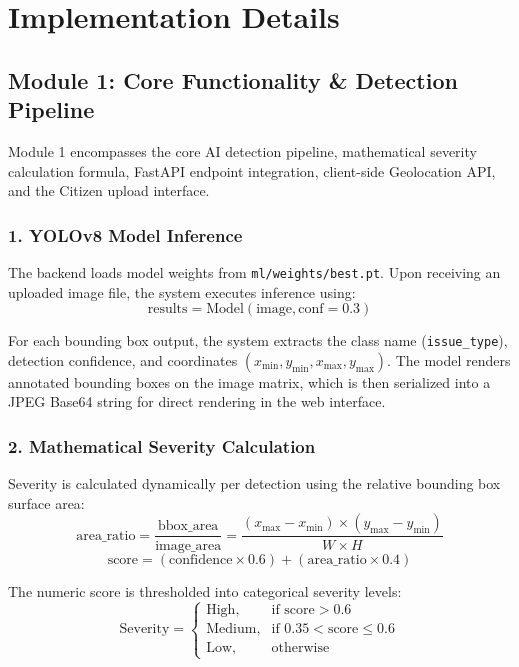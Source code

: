 \documentclass{tietreport}
\begin{document}
\section{Implementation Details}

\subsection{Module 1: Core Functionality \& Detection Pipeline}

Module 1 encompasses the core AI detection pipeline, mathematical severity calculation formula, FastAPI endpoint integration, client-side Geolocation API, and the Citizen upload interface.

\subsubsection{1. YOLOv8 Model Inference}
The backend loads model weights from \texttt{ml/weights/best.pt}. Upon receiving an uploaded image file, the system executes inference using:
\begin{equation}
  \text{results} = \text{Model}(\text{image}, \text{conf} = 0.3)
\end{equation}

For each bounding box output, the system extracts the class name (\texttt{issue\_type}), detection confidence, and coordinates $(x_{\min}, y_{\min}, x_{\max}, y_{\max})$. The model renders annotated bounding boxes on the image matrix, which is then serialized into a JPEG Base64 string for direct rendering in the web interface.

\subsubsection{2. Mathematical Severity Calculation}
Severity is calculated dynamically per detection using the relative bounding box surface area:
\begin{equation}
  \text{area\_ratio} = \frac{\text{bbox\_area}}{\text{image\_area}} = \frac{(x_{\max} - x_{\min}) \times (y_{\max} - y_{\min})}{W \times H}
\end{equation}
\begin{equation}
  \text{score} = (\text{confidence} \times 0.6) + (\text{area\_ratio} \times 0.4)
\end{equation}

The numeric score is thresholded into categorical severity levels:
\begin{equation}
  \text{Severity} = 
  \begin{cases} 
    \text{High}, & \text{if } \text{score} > 0.6 \\
    \text{Medium}, & \text{if } 0.35 < \text{score} \le 0.6 \\
    \text{Low}, & \text{otherwise}
  \end{cases}
\end{equation}
\end{document}
